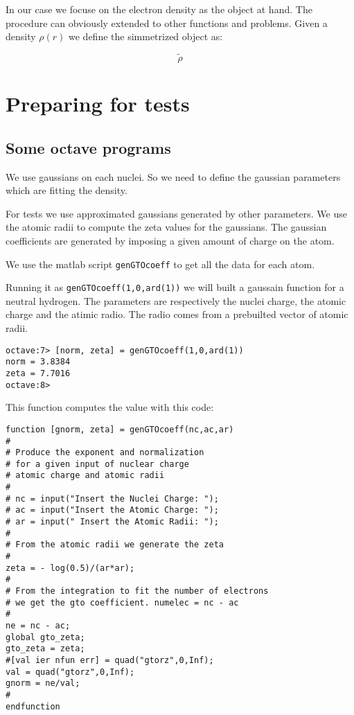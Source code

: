 \documentclass[a4paper,12pt]{article}
\begin{document}
In our case we focuse on the electron density as the object at hand.
The procedure can obviously extended to other functions and problems.
Given a density $\rho(r)$ we define the simmetrized object as:

\begin{equation}
\tilde\rho
\end{equation}

\section{Preparing for tests}

\subsection{Some octave programs}

We use gaussians on each nuclei. So we need to define the
gaussian parameters which are fitting the density.

For tests we use approximated gaussians generated by other
parameters. We use the atomic radii to compute the zeta values
for the gaussians. The gaussian coefficients are generated
by imposing a given amount of charge on the atom.

We use the matlab script \verb|genGTOcoeff| to get all the
data for each atom.

Running it as \verb|genGTOcoeff(1,0,ard(1))| we will built
a gaussain function for a neutral hydrogen. The parameters
are respectively the nuclei charge, the atomic charge and
the atimic radio. The radio comes from a prebuilted vector
of atomic radii.

\begin{verbatim}
octave:7> [norm, zeta] = genGTOcoeff(1,0,ard(1))
norm = 3.8384
zeta = 7.7016
octave:8> 
\end{verbatim}

This function computes the value with this code:

\begin{verbatim}
function [gnorm, zeta] = genGTOcoeff(nc,ac,ar)
#
# Produce the exponent and normalization
# for a given input of nuclear charge
# atomic charge and atomic radii
#
# nc = input("Insert the Nuclei Charge: ");
# ac = input("Insert the Atomic Charge: ");
# ar = input(" Insert the Atomic Radii: ");
#
# From the atomic radii we generate the zeta
#
zeta = - log(0.5)/(ar*ar);
#
# From the integration to fit the number of electrons
# we get the gto coefficient. numelec = nc - ac
#
ne = nc - ac;
global gto_zeta;
gto_zeta = zeta;
#[val ier nfun err] = quad("gtorz",0,Inf);
val = quad("gtorz",0,Inf);
gnorm = ne/val;
#
endfunction
\end{verbatim}
\end{document}
